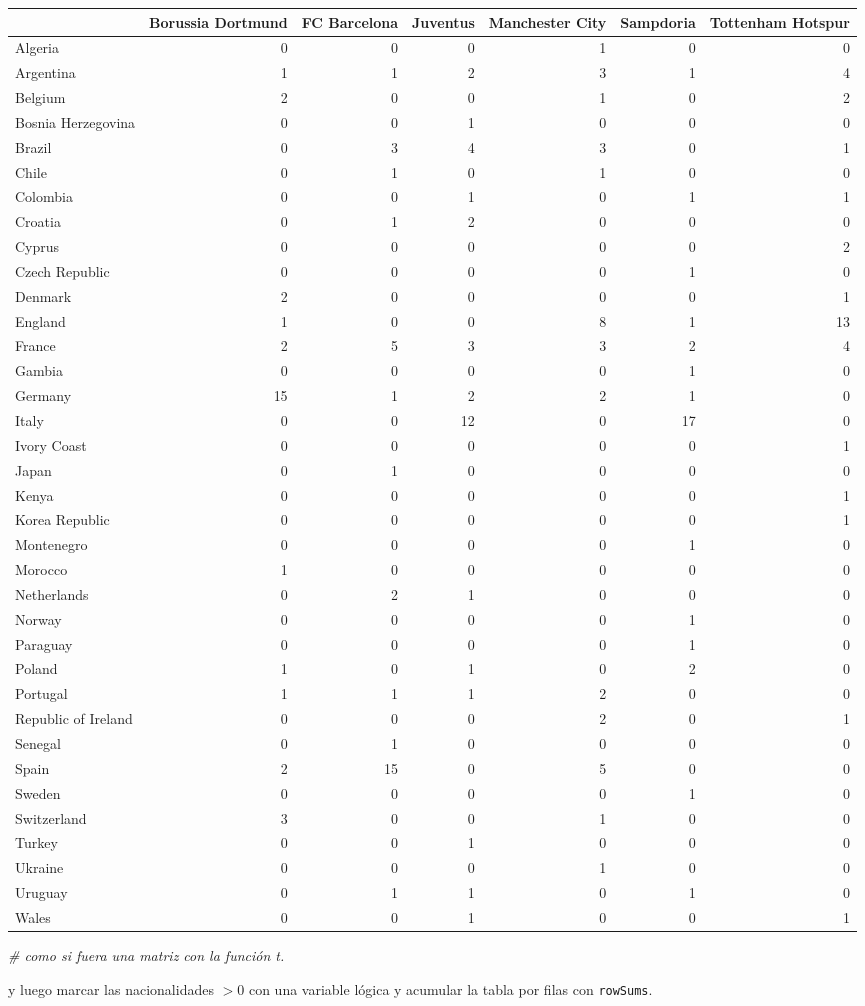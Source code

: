 \documentclass[
]{article}
\newenvironment{Shaded}{\begin{snugshade}}{\end{snugshade}}
\newcommand{\CommentTok}[1]{\textcolor[rgb]{0.56,0.35,0.01}{\textit{#1}}}
\newcommand{\DecValTok}[1]{\textcolor[rgb]{0.00,0.00,0.81}{#1}}
\newcommand{\KeywordTok}[1]{\textcolor[rgb]{0.13,0.29,0.53}{\textbf{#1}}}
\newcommand{\NormalTok}[1]{#1}
\newcommand{\OperatorTok}[1]{\textcolor[rgb]{0.81,0.36,0.00}{\textbf{#1}}}
\begin{document}
\begin{longtable}[]{@{}lrrrrrr@{}}
\toprule
& Borussia Dortmund & FC Barcelona & Juventus & Manchester City &
Sampdoria & Tottenham Hotspur\tabularnewline
\midrule
\endhead
Algeria & 0 & 0 & 0 & 1 & 0 & 0\tabularnewline
Argentina & 1 & 1 & 2 & 3 & 1 & 4\tabularnewline
Belgium & 2 & 0 & 0 & 1 & 0 & 2\tabularnewline
Bosnia Herzegovina & 0 & 0 & 1 & 0 & 0 & 0\tabularnewline
Brazil & 0 & 3 & 4 & 3 & 0 & 1\tabularnewline
Chile & 0 & 1 & 0 & 1 & 0 & 0\tabularnewline
Colombia & 0 & 0 & 1 & 0 & 1 & 1\tabularnewline
Croatia & 0 & 1 & 2 & 0 & 0 & 0\tabularnewline
Cyprus & 0 & 0 & 0 & 0 & 0 & 2\tabularnewline
Czech Republic & 0 & 0 & 0 & 0 & 1 & 0\tabularnewline
Denmark & 2 & 0 & 0 & 0 & 0 & 1\tabularnewline
England & 1 & 0 & 0 & 8 & 1 & 13\tabularnewline
France & 2 & 5 & 3 & 3 & 2 & 4\tabularnewline
Gambia & 0 & 0 & 0 & 0 & 1 & 0\tabularnewline
Germany & 15 & 1 & 2 & 2 & 1 & 0\tabularnewline
Italy & 0 & 0 & 12 & 0 & 17 & 0\tabularnewline
Ivory Coast & 0 & 0 & 0 & 0 & 0 & 1\tabularnewline
Japan & 0 & 1 & 0 & 0 & 0 & 0\tabularnewline
Kenya & 0 & 0 & 0 & 0 & 0 & 1\tabularnewline
Korea Republic & 0 & 0 & 0 & 0 & 0 & 1\tabularnewline
Montenegro & 0 & 0 & 0 & 0 & 1 & 0\tabularnewline
Morocco & 1 & 0 & 0 & 0 & 0 & 0\tabularnewline
Netherlands & 0 & 2 & 1 & 0 & 0 & 0\tabularnewline
Norway & 0 & 0 & 0 & 0 & 1 & 0\tabularnewline
Paraguay & 0 & 0 & 0 & 0 & 1 & 0\tabularnewline
Poland & 1 & 0 & 1 & 0 & 2 & 0\tabularnewline
Portugal & 1 & 1 & 1 & 2 & 0 & 0\tabularnewline
Republic of Ireland & 0 & 0 & 0 & 2 & 0 & 1\tabularnewline
Senegal & 0 & 1 & 0 & 0 & 0 & 0\tabularnewline
Spain & 2 & 15 & 0 & 5 & 0 & 0\tabularnewline
Sweden & 0 & 0 & 0 & 0 & 1 & 0\tabularnewline
Switzerland & 3 & 0 & 0 & 1 & 0 & 0\tabularnewline
Turkey & 0 & 0 & 1 & 0 & 0 & 0\tabularnewline
Ukraine & 0 & 0 & 0 & 1 & 0 & 0\tabularnewline
Uruguay & 0 & 1 & 1 & 0 & 1 & 0\tabularnewline
Wales & 0 & 0 & 1 & 0 & 0 & 1\tabularnewline
\bottomrule
\end{longtable}

\begin{Shaded}
\begin{Highlighting}[]
\CommentTok{# como si fuera una matriz con la función t.}
\end{Highlighting}
\end{Shaded}

y luego marcar las nacionalidades \(>0\) con una variable lógica y
acumular la tabla por filas con \texttt{rowSums}.

\begin{Shaded}
\end{Shaded}
\end{document}
